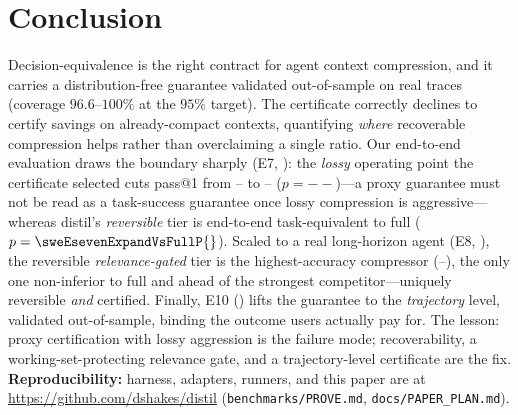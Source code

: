 \documentclass{article}
\newcommand{\sweEsevenFullPass}{--}\newcommand{\sweEsevenFullResolved}{--}%
\newcommand{\sweEsevenDistilPass}{--}\newcommand{\sweEsevenDistilResolved}{--}%
\newcommand{\sweEsevenDistilVsFullP}{--}\newcommand{\sweEsevenLinguaVsFullP}{--}%
\newcommand{\sweEeightGatedPass}{--}\newcommand{\sweEeightGatedResolved}{--}%
\begin{document}
\section{Conclusion}
Decision-equivalence is the right contract for agent context compression, and it carries a
distribution-free guarantee validated out-of-sample on real traces (coverage $96.6$--$100\%$
at the $95\%$ target). The certificate correctly declines to certify savings on
already-compact contexts, quantifying \emph{where} recoverable compression helps rather than
overclaiming a single ratio. Our end-to-end evaluation draws the boundary sharply (E7,
): the \emph{lossy} operating point the certificate selected cuts pass@1 from
\sweEsevenFullPass{} to \sweEsevenDistilPass{} ($p=\sweEsevenDistilVsFullP{}$)---a proxy
guarantee must not be read as a task-success guarantee once lossy compression is
aggressive---whereas distil's \emph{reversible} tier is end-to-end task-equivalent to full
($p=\sweEsevenExpandVsFullP{}$). Scaled to a real long-horizon agent (E8, ), the
reversible \emph{relevance-gated} tier is the highest-accuracy compressor
(\sweEeightGatedPass{}), the only one non-inferior to full and ahead of the strongest
competitor---uniquely reversible \emph{and} certified. Finally, E10 () lifts the
guarantee to the \emph{trajectory} level, validated out-of-sample, binding the outcome users
actually pay for. The lesson: proxy certification with lossy aggression is the failure mode;
recoverability, a working-set-protecting relevance gate, and a trajectory-level certificate
are the fix. \textbf{Reproducibility:} harness, adapters, runners, and this paper are at
\url{https://github.com/dshakes/distil} (\texttt{benchmarks/PROVE.md}, \texttt{docs/PAPER\_PLAN.md}).
\end{document}
